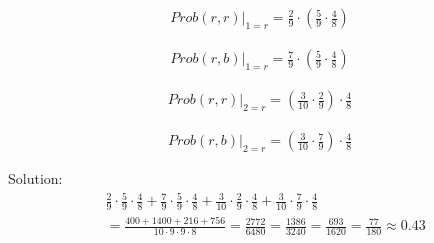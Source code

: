 \begin{align*}
Prob(r,r)|_{1=r} = \frac{2}{9} \cdot (\frac{5}{9} \cdot \frac{4}{8})
\end{align*}

\begin{align*}
Prob(r,b)|_{1=r} = \frac{7}{9} \cdot (\frac{5}{9} \cdot \frac{4}{8})
\end{align*}

\begin{align*}
Prob(r,r)|_{2=r} = (\frac{3}{10} \cdot \frac{2}{9}) \cdot \frac{4}{8}
\end{align*}

\begin{align*}
Prob(r,b)|_{2=r} = (\frac{3}{10} \cdot \frac{7}{9}) \cdot \frac{4}{8}
\end{align*}

Solution:
\begin{align*}
&
\frac{2}{9} \cdot \frac{5}{9} \cdot \frac{4}{8} 
+
\frac{7}{9} \cdot \frac{5}{9} \cdot \frac{4}{8} 
+
\frac{3}{10} \cdot \frac{2}{9} \cdot \frac{4}{8} 
+
\frac{3}{10} \cdot \frac{7}{9} \cdot \frac{4}{8} 
\\
& =
\frac{400+1400+216+756}{10 \cdot 9 \cdot 9 \cdot 8}
=
\frac{2772}{6480}
=
\frac{1386}{3240}
=
\frac{693}{1620}
=
\frac{77}{180}
\approx 0.43
\end{align*}
